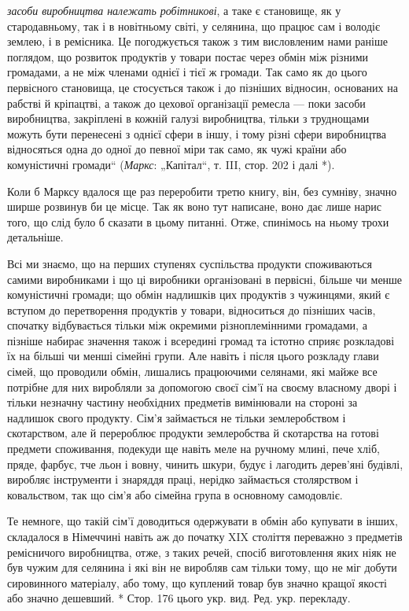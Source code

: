 \parcont{}  %
\emph{засоби виробництва належать робітникові}, а таке є становище, як у стародавньому, так і в новітньому світі, у селянина, що працює
сам і володіє землею, і в ремісника. Це погоджується також з тим висловленим нами раніше поглядом, що розвиток
продуктів у товари постає через обмін між різними громадами, а не між членами однієї і тієї ж громади. Так само як до цього
первісного становища, це стосується також і до пізніших відносин, основаних на рабстві й кріпацтві, а також до цехової
організації ремесла — поки засоби виробництва, закріплені в кожній галузі виробництва, тільки з труднощами можуть бути
перенесені з однієї сфери в іншу, і тому різні сфери виробництва відносяться одна до одної до певної міри так само, як чужі
країни або комуністичні громади“ (\emph{Маркс}: „Капітал“,  т. III, стор. 202 і далі *).

Коли б Марксу вдалося ще раз переробити третю книгу, він, без сумніву, значно ширше розвинув би це місце. Так як воно тут
написане, воно дає лише нарис того, що слід було б сказати в цьому питанні. Отже, спинімось на ньому трохи детальніше.

Всі ми знаємо, що на перших ступенях суспільства продукти споживаються самими виробниками і що ці виробники організовані в
первісні, більше чи менше комуністичні громади; що обмін надлишків цих продуктів з чужинцями, який є вступом до перетворення
продуктів у товари, відноситься до пізніших часів, спочатку відбувається тільки між окремими різноплемінними громадами, а
пізніше набирає значення також і всередині громад та істотно сприяє розкладові їх на більші чи менші сімейні групи. Але
навіть і після цього розкладу глави сімей, що проводили обмін, лишались працюючими селянами, які майже все потрібне для
них виробляли за допомогою своєї сім’ї на своєму власному дворі і тільки незначну частину необхідних предметів вимінювали на
стороні за надлишок свого продукту. Сім’я займається не тільки землеробством і скотарством, але й перероблює продукти
землеробства й скотарства на готові предмети споживання, подекуди ще навіть меле на ручному млині, пече хліб, пряде, фарбує,
тче льон і вовну, чинить шкури, будує і лагодить дерев’яні будівлі, виробляє інструменти і знаряддя праці, нерідко
займається столярством і ковальством, так що сім’я або сімейна група в основному самодовліє.

Те немноге, що такій сім’ї
доводиться одержувати в обмін або купувати в інших, складалося в Німеччині навіть аж до початку XIX століття переважно з
предметів ремісничого виробництва, отже, з таких речей, спосіб виготовлення яких ніяк не був чужим для селянина і які він не
виробляв сам тільки тому, що не міг добути сировинного матеріалу, або тому, що куплений товар був значно кращої якості або
значно дешевший.
* Стор. 176 цього укр. вид. Ред. укр. перекладу.
